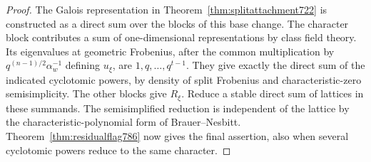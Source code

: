 \documentclass[a4paper,11pt]{article}
\theoremstyle{definition}
\theoremstyle{remark}
\numberwithin{equation}{section}
\begin{document}
\begin{proof}
The Galois representation in
Theorem~\ref{thm:splitattachment722} is constructed
as a direct sum over the blocks of this base change.
The character block contributes a sum of one-dimensional
representations by class field theory. Its eigenvalues
at geometric Frobenius, after the common multiplication
by \(q^{(n-1)/2}\alpha_w^{-1}\) defining \(u_\xi\),
are \(1,q,\ldots,q^{t-1}\). They give exactly the
direct sum of the indicated cyclotomic powers, by
density of split Frobenius and characteristic-zero
semisimplicity. The other blocks give \(R_\xi\).
Reduce a stable direct sum of lattices in these
summands. The semisimplified reduction is independent
of the lattice by the characteristic-polynomial
form of Brauer--Nesbitt. Theorem~\ref{thm:residualflag786}
now gives the final assertion, also when several
cyclotomic powers reduce to the same character.
\end{proof}
\end{document}
